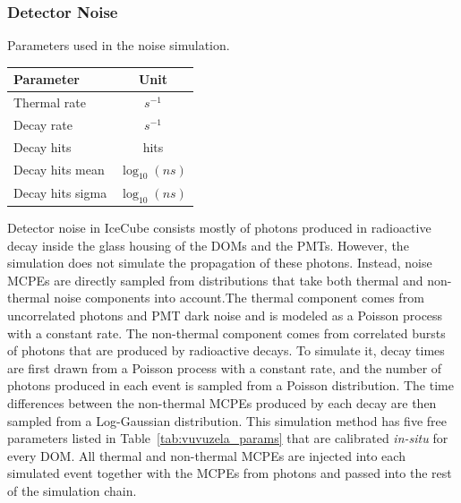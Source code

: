 \subsubsection{Detector Noise}

\begin{margintable}
\caption{\label{tab:vuvuzela_params} Parameters used in the noise simulation. }
    \begin{tabular}{lc}\toprule
        \textbf{Parameter} & \textbf{Unit} \\ \midrule
        Thermal rate &  $s^{-1}$ \\ 
        Decay rate &  $s^{-1}$ \\
        Decay hits &  hits \\ 
        Decay hits mean &  $\log_{10} (ns) $\\ 
        Decay hits sigma &  $\log_{10} (ns) $ \\ \bottomrule
    \end{tabular}
\end{margintable}
Detector noise in IceCube consists mostly of photons produced in radioactive decay inside the glass housing of the DOMs and the PMTs. However, the simulation does not simulate the propagation of these photons. Instead, noise MCPEs are directly sampled from distributions that take both thermal and non-thermal noise components into account.The thermal component comes from uncorrelated photons and PMT dark noise and is modeled as a Poisson process with a constant rate. The non-thermal component comes from correlated bursts of photons that are produced by radioactive decays. To simulate it, decay times are first drawn from a Poisson process with a constant rate, and the number of photons produced in each event is sampled from a Poisson distribution. The time differences between the non-thermal MCPEs produced by each decay are then sampled from a Log-Gaussian distribution. This simulation method has five free parameters listed in Table~\ref{tab:vuvuzela_params} that are calibrated \emph{in-situ} for every DOM. All thermal and non-thermal MCPEs are injected into each simulated event together with the MCPEs from photons and passed into the rest of the simulation chain.


